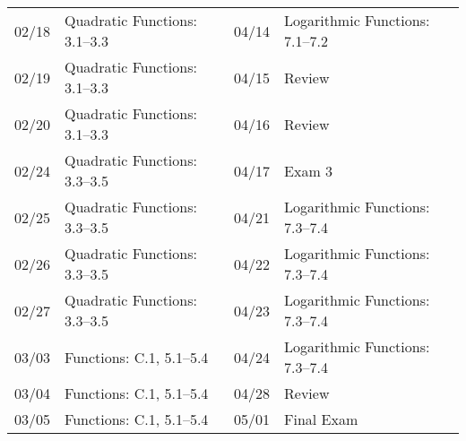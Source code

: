 \documentclass[11pt,letterpaper]{article}
\begin{document}
\begin{table}[!ht]
{\begin{tabular}{ll || ll}
	02/18 & Quadratic Functions: 3.1--3.3 & 04/14 & Logarithmic Functions: 7.1--7.2 \\
	02/19 & Quadratic Functions: 3.1--3.3 & 04/15 & Review \\
	02/20 & Quadratic Functions: 3.1--3.3 & 04/16 & Review \\
	02/24 & Quadratic Functions: 3.3--3.5 & 04/17 & Exam 3 \\
	02/25 & Quadratic Functions: 3.3--3.5 & 04/21 & Logarithmic Functions: 7.3--7.4 \\
	02/26 & Quadratic Functions: 3.3--3.5 & 04/22 & Logarithmic Functions: 7.3--7.4 \\
	02/27 & Quadratic Functions: 3.3--3.5 & 04/23 & Logarithmic Functions: 7.3--7.4 \\
	03/03 & Functions: C.1, 5.1--5.4 & 04/24 & Logarithmic Functions: 7.3--7.4 \\
	03/04 & Functions: C.1, 5.1--5.4 & 04/28 & Review \\
	03/05 & Functions: C.1, 5.1--5.4 & 05/01 & Final Exam
        \end{tabular}
        }
        \end{table}
\end{document}
